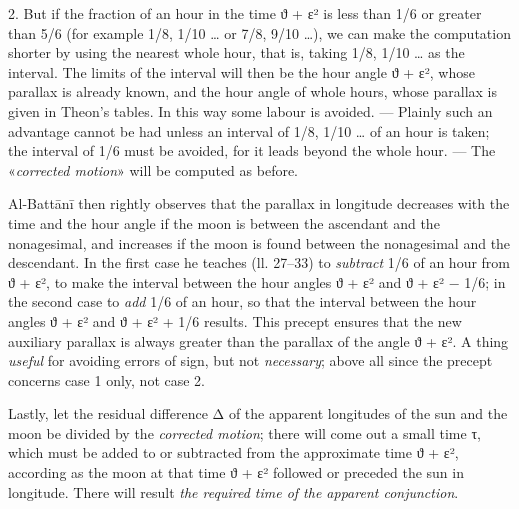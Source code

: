 \documentclass[11pt]{article}
\begin{document}
\par 2. But if the fraction of an hour in the time {\greekfont ϑ} + {\greekfont ε}² is less than 1/6 or greater than 5/6 (for example 1/8, 1/10 … or 7/8, 9/10 …), we can make the computation shorter by using the nearest whole hour, that is, taking 1/8, 1/10 … as the interval. The limits of the interval will then be the hour angle {\greekfont ϑ} + {\greekfont ε}², whose parallax is already known, and the hour angle of whole hours, whose parallax is given in Theon's tables. In this way some labour is avoided. — Plainly such an advantage cannot be had unless an interval of 1/8, 1/10 … of an hour is taken; the interval of 1/6 must be avoided, for it leads beyond the whole hour. — The «\emph{corrected motion}» will be computed as before.\par
\par Al-Battānī then rightly observes that the parallax in longitude decreases with the time and the hour angle if the moon is between the ascendant and the nonagesimal, and increases if the moon is found between the nonagesimal and the descendant. In the first case he teaches (ll. 27–33) to \emph{subtract} 1/6 of an hour from {\greekfont ϑ} + {\greekfont ε}², to make the interval between the hour angles {\greekfont ϑ} + {\greekfont ε}² and {\greekfont ϑ} + {\greekfont ε}² − 1/6; in the second case to \emph{add} 1/6 of an hour, so that the interval between the hour angles {\greekfont ϑ} + {\greekfont ε}² and {\greekfont ϑ} + {\greekfont ε}² + 1/6 results. This precept ensures that the new auxiliary parallax is always greater than the parallax of the angle {\greekfont ϑ} + {\greekfont ε}². A thing \emph{useful} for avoiding errors of sign, but not \emph{necessary}; above all since the precept concerns case 1 only, not case 2.\par
\par Lastly, let the residual difference {\greekfont Δ} of the apparent longitudes of the sun and the moon be divided by the \emph{corrected motion}; there will come out a small time {\greekfont τ}, which must be added to or subtracted from the approximate time {\greekfont ϑ} + {\greekfont ε}², according as the moon at that time {\greekfont ϑ} + {\greekfont ε}² followed or preceded the sun in longitude. There will result \emph{the required time of the apparent conjunction}.\par
\end{document}
